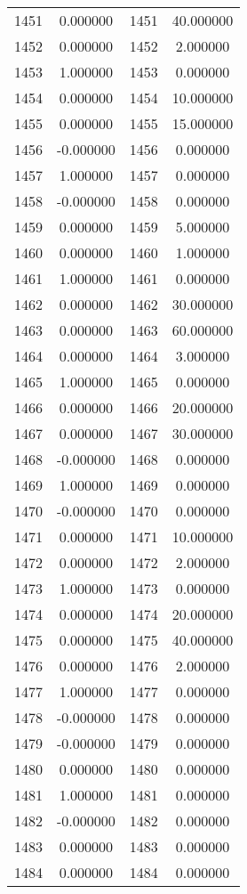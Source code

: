 \documentclass[12pt]{article}
\begin{document}
\begin{longtable}{@{}cccc@{}}
1451 & 0.000000 & 1451 & 40.000000 \\
1452 & 0.000000 & 1452 & 2.000000 \\
1453 & 1.000000 & 1453 & 0.000000 \\
1454 & 0.000000 & 1454 & 10.000000 \\
1455 & 0.000000 & 1455 & 15.000000 \\
1456 & -0.000000 & 1456 & 0.000000 \\
1457 & 1.000000 & 1457 & 0.000000 \\
1458 & -0.000000 & 1458 & 0.000000 \\
1459 & 0.000000 & 1459 & 5.000000 \\
1460 & 0.000000 & 1460 & 1.000000 \\
1461 & 1.000000 & 1461 & 0.000000 \\
1462 & 0.000000 & 1462 & 30.000000 \\
1463 & 0.000000 & 1463 & 60.000000 \\
1464 & 0.000000 & 1464 & 3.000000 \\
1465 & 1.000000 & 1465 & 0.000000 \\
1466 & 0.000000 & 1466 & 20.000000 \\
1467 & 0.000000 & 1467 & 30.000000 \\
1468 & -0.000000 & 1468 & 0.000000 \\
1469 & 1.000000 & 1469 & 0.000000 \\
1470 & -0.000000 & 1470 & 0.000000 \\
1471 & 0.000000 & 1471 & 10.000000 \\
1472 & 0.000000 & 1472 & 2.000000 \\
1473 & 1.000000 & 1473 & 0.000000 \\
1474 & 0.000000 & 1474 & 20.000000 \\
1475 & 0.000000 & 1475 & 40.000000 \\
1476 & 0.000000 & 1476 & 2.000000 \\
1477 & 1.000000 & 1477 & 0.000000 \\
1478 & -0.000000 & 1478 & 0.000000 \\
1479 & -0.000000 & 1479 & 0.000000 \\
1480 & 0.000000 & 1480 & 0.000000 \\
1481 & 1.000000 & 1481 & 0.000000 \\
1482 & -0.000000 & 1482 & 0.000000 \\
1483 & 0.000000 & 1483 & 0.000000 \\
1484 & 0.000000 & 1484 & 0.000000 \\

\end{longtable}
\end{document}
